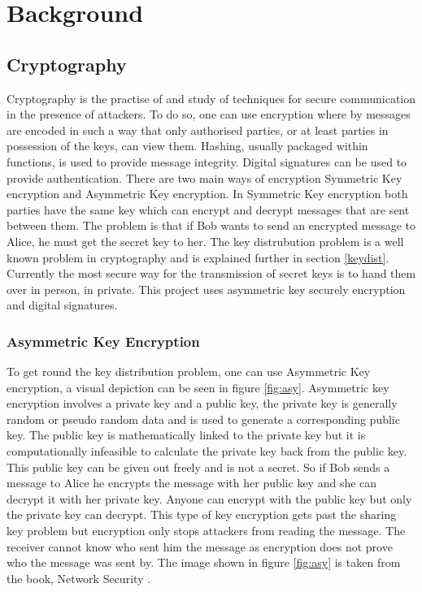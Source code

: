 
\chapter{Background}
\label{back}

\section{Cryptography}

Cryptography is the practise of and study of techniques for secure communication in the presence of attackers. To do so, one can use encryption where by messages are encoded in such a way that only authorised parties, or at least parties in possession of the keys, can view them. Hashing, usually packaged within functions, is used to provide message integrity. Digital signatures can be used to provide authentication. There are two main ways of encryption Symmetric Key encryption and Asymmetric Key encryption. In Symmetric Key encryption both parties have the same key which can encrypt and decrypt messages that are sent between them. The problem is that if Bob wants to send an encrypted message to Alice, he must get the secret key to her. The key distrubution problem is a well known problem in cryptography and is explained further in section \ref{keydist}. Currently the most secure way for the transmission of secret keys is to hand them over in person, in private. This project uses asymmetric key securely encryption and digital signatures.


\subsection{Asymmetric Key Encryption}

To get round the key distribution problem, one can use Asymmetric Key encryption, a visual depiction can be seen in figure \ref{fig:asy}. Asymmetric key encryption involves a private key and a public key, the private key is generally random or pseudo random data and is used to generate a corresponding public key. The public key is mathematically linked to the private key but it is computationally infeasible to calculate the private key back from the public key. This public key can be given out freely and is not a secret. So if Bob sends a message to Alice he encrypts the message with her public key and she can decrypt it with her private key. Anyone can encrypt with the public key but only the private key can decrypt. This type of key encryption gets past the sharing key problem but encryption only stops attackers from reading the message. The receiver cannot know who sent him the message as encryption does not prove who the message was sent by. The image shown in figure \ref{fig:asy} is taken from the book, Network Security \cite{NetworkSec}.

